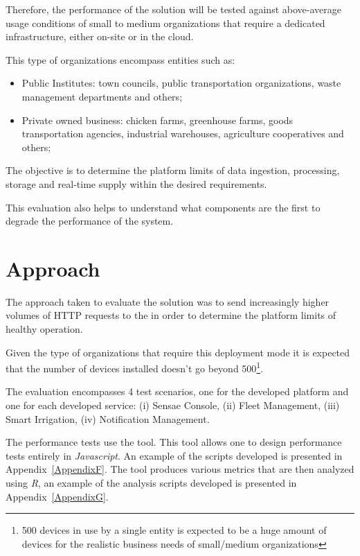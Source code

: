 Therefore, the performance of the solution will be tested against above-average usage conditions of small to medium organizations that require a dedicated infrastructure, either on-site or in the cloud.

This type of organizations encompass entities such as:

\begin{itemize}
    \item Public Institutes: town councils, public transportation organizations, waste management departments and others;
    \item Private owned business: chicken farms, greenhouse farms, goods transportation agencies, industrial warehouses, agriculture cooperatives and others;
\end{itemize}

The objective is to determine the platform limits of data ingestion, processing, storage and real-time supply within the desired requirements.

This evaluation also helps to understand what components are the first to degrade the performance of the system.

\section{Approach}
\label{sec:evaluation:approach}

The approach taken to evaluate the solution was to send increasingly higher volumes of HTTP requests to the  in order to determine the platform limits of healthy operation.

Given the type of organizations that require this deployment mode it is expected that the number of devices installed doesn't go beyond 500\footnote{500 devices in use by a single entity is expected to be a huge amount of devices for the realistic business needs of small/medium organizations}.

The evaluation encompasses 4 test scenarios, one for the developed platform and one for each developed service: (i) Sensae Console, (ii) Fleet Management, (iii) Smart Irrigation, (iv) Notification Management.

The performance tests use the  tool. This tool allows one to design performance tests entirely in \textit{Javascript}. An example of the scripts developed is presented in Appendix~\ref{AppendixF}. The  tool produces various metrics that are then analyzed using \textit{R}, an example of the analysis scripts developed is presented in Appendix~\ref{AppendixG}.

